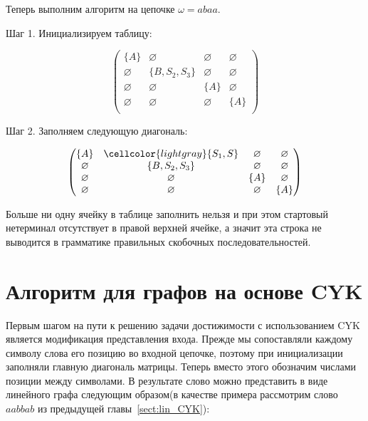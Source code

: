 \begin{example}
Теперь выполним алгоритм на цепочке $\omega=abaa$.

Шаг 1. Инициализируем таблицу:

\[
\begin{pmatrix}
\{A\}       & \varnothing    & \varnothing & \varnothing    \\
\varnothing & \{B, S_2, S_3\} & \varnothing & \varnothing       \\
\varnothing & \varnothing    & \{A\}       & \varnothing    \\
\varnothing & \varnothing    & \varnothing & \{A\}          \\
\end{pmatrix}
\]

Шаг 2. Заполняем следующую диагональ:

\[
\begin{pmatrix}
\{A\}       & \cellcolor{lightgray}\{S_1, S\}     & \varnothing & \varnothing    \\
\varnothing & \{B, S_2, S_3\} & \varnothing & \varnothing       \\
\varnothing & \varnothing    & \{A\}       & \varnothing    \\
\varnothing & \varnothing    & \varnothing & \{A\}          \\
\end{pmatrix}
\]

Больше ни одну ячейку в таблице заполнить нельзя и при этом стартовый нетерминал отсутствует в правой верхней ячейке, а значит эта строка не выводится в грамматике правильных скобочных последовательностей.

\end{example}

\section{Алгоритм для графов на основе CYK}
\label{graph:CYK}
Первым шагом на пути к решению задачи достижимости с использованием CYK является модификация представления входа. Прежде мы сопоставляли каждому символу слова его позицию во входной цепочке, поэтому при инициализации заполняли главную диагональ матрицы. Теперь вместо этого обозначим числами позиции между символами. В результате слово можно представить в виде линейного графа следующим образом(в качестве примера рассмотрим слово $a a b b a b$ из предыдущей главы~\ref{sect:lin_CYK}):

\begin{center}
\end{center}


